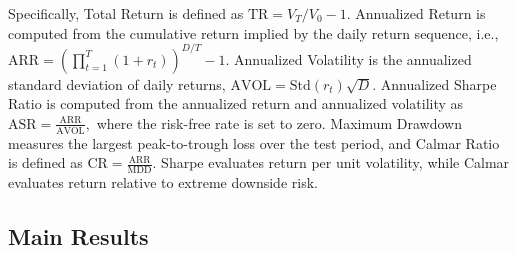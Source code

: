 \documentclass[letterpaper]{article} %
\begin{document}
Specifically, Total Return is defined as \(\mathrm{TR}=V_T/V_0-1\). Annualized Return is computed from the cumulative return implied by the daily return sequence, i.e.,
$
\mathrm{ARR}
=
\left(\prod_{t=1}^{T}(1+r_t)\right)^{D/T}-1.
$
Annualized Volatility is the annualized standard deviation of daily returns,
$
\mathrm{AVOL}
=
\mathrm{Std}(r_t)\sqrt{D}.
$
Annualized Sharpe Ratio is computed from the annualized return and annualized volatility as
$
\mathrm{ASR}=\frac{\mathrm{ARR}}{\mathrm{AVOL}},
$
where the risk-free rate is set to zero. Maximum Drawdown measures the largest peak-to-trough loss over the test period, and Calmar Ratio is defined as
$
\mathrm{CR}=\frac{\mathrm{ARR}}{\mathrm{MDD}}.
$
Sharpe evaluates return per unit volatility, while Calmar evaluates return relative to extreme downside risk.

\subsection{Main Results}
\end{document}
